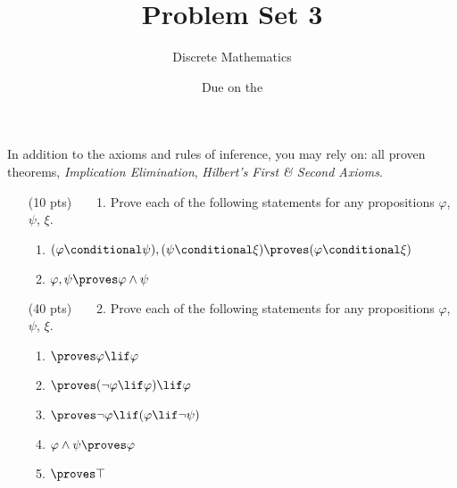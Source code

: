 




\title{Problem Set 3}
\author[Daniel Gonzalez Cedre]{Discrete Mathematics}
\date{Due on the }



\maketitle

In addition to the axioms and rules of inference, you may rely on: all proven theorems, \emph{Implication Elimination}, \emph{Hilbert's First \& Second Axioms}.

\begin{enumerate}
  \item[(10 pts)~~~~1.]
    Prove each of the following statements for any propositions $\varphi$, $\psi$, $\xi$.
    \begin{enumerate}
      \item
        $(\varphi \conditional \psi), (\psi \conditional \xi) \proves (\varphi \conditional \xi)$%
      \item
        $\varphi, \psi \proves \varphi \land \psi$%
    \end{enumerate}
  \item[(40 pts)~~~~2.]
    Prove each of the following statements for any propositions $\varphi$, $\psi$, $\xi$.
    \begin{enumerate}
      \item
        $\proves \varphi \lif \varphi$
      \item
        $\proves (\neg \varphi \lif \varphi) \lif \varphi$%
      \item
        $\proves \neg \varphi \lif (\varphi \lif \neg \psi)$%
      \item
        $\varphi \land \psi \proves \varphi$%
      \item
        $\proves \top$%

\end{enumerate}
\end{enumerate}
